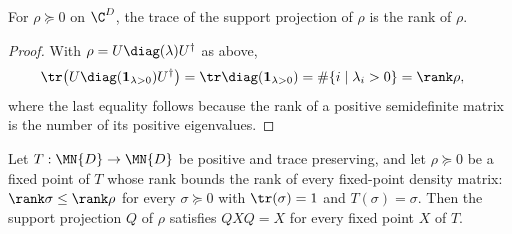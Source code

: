 \begin{lemma}%
    \label{lem:trace_stationaryProj}
    \leanok
    For $\rho\succeq0$ on $\C^D$, the trace of the support projection of
    $\rho$ is the rank of $\rho$.
\end{lemma}

\begin{proof}
    \leanok
    With $\rho=U\diag(\lambda)U^\dagger$ as above,
    \begin{align}
        \tr\!\left(U\diag(\mathbf 1_{\lambda>0})U^\dagger\right)
         & =\tr\diag(\mathbf 1_{\lambda>0})
        =\#\{i\mid\lambda_i>0\}
        =\rank\rho,
        \notag
    \end{align}
    where the last equality follows because the rank of a positive
    semidefinite matrix is the number of its positive eigenvalues.
\end{proof}

\begin{theorem}%
    \label{thm:maximalSupport_of_maximalRank}
    \leanok
    Let $T:\MN{D}\to\MN{D}$ be positive and trace preserving, and let
    $\rho\succeq0$ be a fixed point of $T$ whose rank bounds the rank of
    every fixed-point density matrix:
    $\rank\sigma\leq\rank\rho$ for every $\sigma\succeq0$ with
    $\tr(\sigma)=1$ and $T(\sigma)=\sigma$. Then the support projection $Q$
    of $\rho$ satisfies $QXQ=X$ for every fixed point $X$ of $T$.
\end{theorem}

